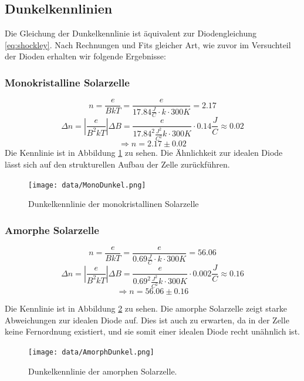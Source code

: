 \subsection{Dunkelkennlinien}

Die Gleichung der Dunkelkennlinie ist äquivalent zur Diodengleichung \ref{eq:shockley}. Nach Rechnungen und Fits gleicher Art, wie zuvor im Versuchteil der Dioden erhalten wir folgende Ergebnisse:
\subsubsection{Monokristalline Solarzelle}

$$
    n=\frac{e}{BkT}=\frac{e}{17.84\frac{J}{C}\cdot k\cdot 300K}=2.17        
$$
$$
    \Delta n=\left|\frac{e}{B^2kT}\right| \Delta B=\frac{e}{17.84^2\frac{J^2}{C^2}k\cdot300K}\cdot0.14\frac{J}{C}\approx0.02
$$
$$
    \Rightarrow n=2.17\pm0.02
$$
\noindent Die Kennlinie ist in Abbildung \ref{fig:monokrisdunkel} zu sehen. Die Ähnlichkeit zur idealen Diode lässt sich auf den strukturellen Aufbau der Zelle zurückführen.\\

\begin{figure}[h!]
    \centering
    \texttt{[image: data/MonoDunkel.png]}
    \caption{Dunkelkennlinie der monokristallinen Solarzelle}
    \label{fig:monokrisdunkel}
\end{figure}

\subsubsection{Amorphe Solarzelle}

$$
    n=\frac{e}{BkT}=\frac{e}{0.69\frac{J}{C}\cdot k\cdot 300K}=56.06        
$$
$$
    \Delta n=\left|\frac{e}{B^2kT}\right| \Delta B=\frac{e}{0.69^2\frac{J^2}{C^2}k\cdot300K}\cdot0.002\frac{J}{C}\approx0.16
$$
$$
    \Rightarrow n=56.06\pm0.16
$$

\noindent Die Kennlinie ist in Abbildung \ref{fig:amodunkel} zu sehen. Die amorphe Solarzelle zeigt starke Abweichungen zur idealen Diode auf. Dies ist auch zu erwarten, da in der Zelle keine Fernordnung existiert, und sie somit einer idealen Diode recht unähnlich ist.\\

\begin{figure}[h]
    \centering
    \texttt{[image: data/AmorphDunkel.png]}
    \caption{Dunkelkennlinie der amorphen Solarzelle.}
    \label{fig:amodunkel}
\end{figure}


